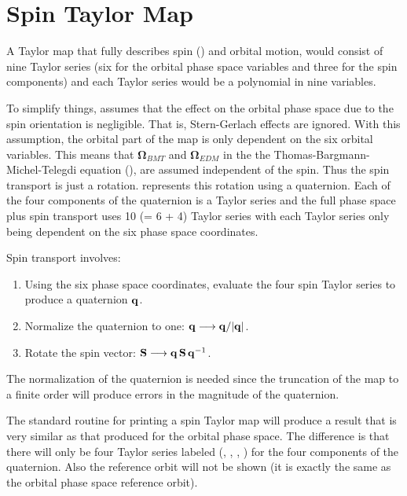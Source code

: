 \section{Spin Taylor Map}
\label{s:spin.map}

A Taylor map that fully describes spin () and orbital motion, would consist of nine
Taylor series (six for the orbital phase space variables and three for the spin components) and each
Taylor series would be a polynomial in nine variables.

To simplify things, \bmad assumes that the effect on the orbital phase space due to the spin
orientation is negligible. That is, Stern-Gerlach effects are ignored. With this assumption, the
orbital part of the map is only dependent on the six orbital variables. This means that
${\pmb\Omega}_{BMT}$ and ${\pmb\Omega}_{EDM}$ in the the Thomas-Bargmann-Michel-Telegdi equation
(), are assumed independent of the spin. Thus the spin transport is just a rotation.
\bmad represents this rotation using a quaternion. Each of the four components of the quaternion is
a Taylor series and the full phase space plus spin transport uses 10 (= 6 + 4) Taylor series with
each Taylor series only being dependent on the six phase space coordinates.

Spin transport involves:
\begin{enumerate}
\item Using the six phase space coordinates, evaluate the four spin Taylor series to produce a quaternion ${\bf q}$.
\item Normalize the quaternion to one: ${\bf q} \longrightarrow {\bf q}/|{\bf q}|$.
\item Rotate the spin vector: ${\bf S} \longrightarrow {\bf q} \, {\bf S} \, {\bf q}^{-1}$.
\end{enumerate}
The  normalization of the quaternion is needed since the truncation of the map to a finite order will produce errors
in the magnitude of the quaternion.

The standard \bmad routine for printing a spin Taylor map will produce a result that is very similar
as that produced for the orbital phase space. The difference is that there will only be four Taylor
series labeled (, , , ) for the four components of the quaternion. Also the reference orbit
will not be shown (it is exactly the same as the orbital phase space reference orbit).

